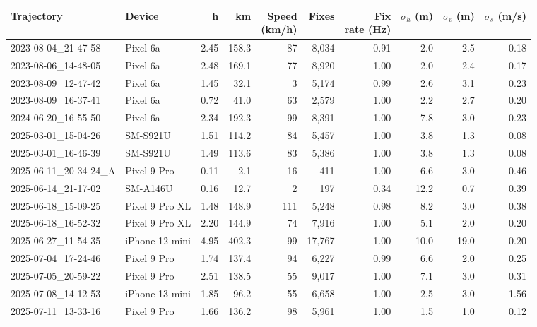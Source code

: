 \begin{tabular}{llrrrrrrrr}
\toprule
Trajectory & Device & h & km & \makecell{Speed\\(km/h)} & Fixes & \makecell{Fix\\rate (Hz)} & \makecell{\(\sigma_h\)\\(m)} & \makecell{\(\sigma_v\)\\(m)} & \makecell{\(\sigma_s\)\\(m/s)} \\
\midrule
2023-08-04\_21-47-58 & Pixel 6a & 2.45 & 158.3 & 87 & 8{,}034 & 0.91 & 2.0 & 2.5 & 0.18 \\
2023-08-06\_14-48-05 & Pixel 6a & 2.48 & 169.1 & 77 & 8{,}920 & 1.00 & 2.0 & 2.4 & 0.17 \\
2023-08-09\_12-47-42 & Pixel 6a & 1.45 & 32.1 & 3 & 5{,}174 & 0.99 & 2.6 & 3.1 & 0.23 \\
2023-08-09\_16-37-41 & Pixel 6a & 0.72 & 41.0 & 63 & 2{,}579 & 1.00 & 2.2 & 2.7 & 0.20 \\
2024-06-20\_16-55-50 & Pixel 6a & 2.34 & 192.3 & 99 & 8{,}391 & 1.00 & 7.8 & 3.0 & 0.23 \\
2025-03-01\_15-04-26 & SM-S921U & 1.51 & 114.2 & 84 & 5{,}457 & 1.00 & 3.8 & 1.3 & 0.08 \\
2025-03-01\_16-46-39 & SM-S921U & 1.49 & 113.6 & 83 & 5{,}386 & 1.00 & 3.8 & 1.3 & 0.08 \\
2025-06-11\_20-34-24\_A & Pixel 9 Pro & 0.11 & 2.1 & 16 & 411 & 1.00 & 6.6 & 3.0 & 0.46 \\
2025-06-14\_21-17-02 & SM-A146U & 0.16 & 12.7 & 2 & 197 & 0.34 & 12.2 & 0.7 & 0.39 \\
2025-06-18\_15-09-25 & Pixel 9 Pro XL & 1.48 & 148.9 & 111 & 5{,}248 & 0.98 & 8.2 & 3.0 & 0.38 \\
2025-06-18\_16-52-32 & Pixel 9 Pro XL & 2.20 & 144.9 & 74 & 7{,}916 & 1.00 & 5.1 & 2.0 & 0.20 \\
2025-06-27\_11-54-35 & iPhone 12 mini & 4.95 & 402.3 & 99 & 17{,}767 & 1.00 & 10.0 & 19.0 & 0.20 \\
2025-07-04\_17-24-46 & Pixel 9 Pro & 1.74 & 137.4 & 94 & 6{,}227 & 0.99 & 6.6 & 2.0 & 0.25 \\
2025-07-05\_20-59-22 & Pixel 9 Pro & 2.51 & 138.5 & 55 & 9{,}017 & 1.00 & 7.1 & 3.0 & 0.31 \\
2025-07-08\_14-12-53 & iPhone 13 mini & 1.85 & 96.2 & 55 & 6{,}658 & 1.00 & 2.5 & 3.0 & 1.56 \\
2025-07-11\_13-33-16 & Pixel 9 Pro & 1.66 & 136.2 & 98 & 5{,}961 & 1.00 & 1.5 & 1.0 & 0.12 \\

\end{tabular}
